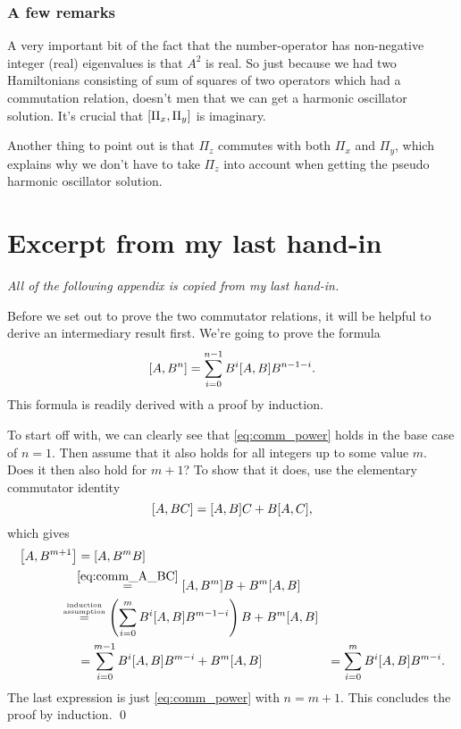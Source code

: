 \documentclass[11pt,letter, swedish, english
]{article}
\begin{document}

\subsubsection*{A few remarks}
A very important bit of the fact that the number-operator has
non-negative integer (real) eigenvalues is that $A^2$ is real. So just
because we had two Hamiltonians consisting of sum of squares of two
operators which had a commutation relation, doesn't men that we can get
a harmonic oscillator solution. It's crucial that
$\comm{\Pi_x}{\Pi_y}$ is imaginary. 

Another thing to point out is that $\Pi_z$ commutes with both $\Pi_x$
and $\Pi_y$, which explains why we don't have to take $\Pi_z$ into
account when getting the pseudo harmonic oscillator solution. 



\newpage
\appendix


\section{Excerpt from my last hand-in}\label{sec:comm}
\textit{All of the following appendix is copied from my last hand-in.}

Before we set out to prove the two commutator relations, it will be
helpful to derive an intermediary result first. We're going to prove
the formula
\begin{equation} \label{eq:comm_power}
\comm{A}{B^n} = \sum_{i=0}^{n-1} B^{i}\comm{A}{B}B^{n-1-i}.
\end{equation}
This formula is readily derived with a proof by induction. 

To start off with, we can clearly see that \eqref{eq:comm_power} holds
in the base case of $n=1$. Then assume that it also holds for all
integers up to some value $m$. Does it then also hold for $m+1$?
To show that it does, use the elementary commutator
identity
\begin{equation} \label{eq:comm_A_BC}
\comm{A}{BC} = \comm{A}{B}C+B\comm{A}{C},
\end{equation}
which gives
\begin{equation}
\begin{aligned}
\comm{A}{B^{m+1}} &= \comm{A}{B^{m}B} \\
&\hspace{-3pt}\stackrel{\eqref{eq:comm_A_BC}}{=} \comm{A}{B^{m}}B + B^m\comm{A}{B}\\
&\hspace{-14pt}\stackrel{\stackrel{\text{\tiny induction}}{\text{\tiny assumption}}}{=}
\left(\sum_{i=0}^{m} B^{i}\comm{A}{B}B^{m-1-i}\right) B + B^m\comm{A}{B}\\
&=\sum_{i=0}^{m-1} B^{i}\comm{A}{B}B^{m-i} + B^m\comm{A}{B}&=\sum_{i=0}^{m} B^{i}\comm{A}{B}B^{m-i}.
\end{aligned}
\end{equation}
The last expression is just \eqref{eq:comm_power} with $n=m+1$. This
concludes the proof by induction. \qed
\end{document}
